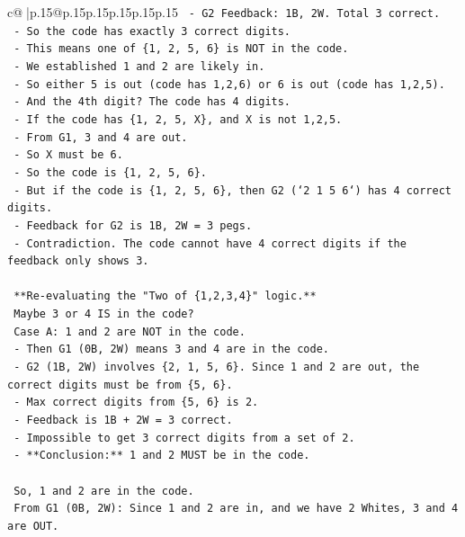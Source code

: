 \documentclass{article}
\begin{document}
{\begin{supertabular}{c@{$\;$}|p{.15\linewidth}@{}p{.15\linewidth}p{.15\linewidth}p{.15\linewidth}p{.15\linewidth}p{.15\linewidth}}
{{{\texttt{    {-} G2 Feedback: 1B, 2W. Total 3 correct.} \\
\texttt{    {-} So the code has exactly 3 correct digits.} \\
\texttt{    {-} This means one of \{1, 2, 5, 6\} is NOT in the code.} \\
\texttt{    {-} We established 1 and 2 are likely in.} \\
\texttt{    {-} So either 5 is out (code has 1,2,6) or 6 is out (code has 1,2,5).} \\
\texttt{    {-} And the 4th digit? The code has 4 digits.} \\
\texttt{    {-} If the code has \{1, 2, 5, X\}, and X is not 1,2,5.} \\
\texttt{    {-} From G1, 3 and 4 are out.} \\
\texttt{    {-} So X must be 6.} \\
\texttt{    {-} So the code is \{1, 2, 5, 6\}.} \\
\texttt{    {-} But if the code is \{1, 2, 5, 6\}, then G2 (`2 1 5 6`) has 4 correct digits.} \\
\texttt{    {-} Feedback for G2 is 1B, 2W = 3 pegs.} \\
\texttt{    {-} Contradiction. The code cannot have 4 correct digits if the feedback only shows 3.} \\
\\ 
\texttt{    **Re{-}evaluating the "Two of \{1,2,3,4\}" logic.**} \\
\texttt{    Maybe 3 or 4 IS in the code?} \\
\texttt{    Case A: 1 and 2 are NOT in the code.} \\
\texttt{    {-} Then G1 (0B, 2W) means 3 and 4 are in the code.} \\
\texttt{    {-} G2 (1B, 2W) involves \{2, 1, 5, 6\}. Since 1 and 2 are out, the correct digits must be from \{5, 6\}.} \\
\texttt{    {-} Max correct digits from \{5, 6\} is 2.} \\
\texttt{    {-} Feedback is 1B + 2W = 3 correct.} \\
\texttt{    {-} Impossible to get 3 correct digits from a set of 2.} \\
\texttt{    {-} **Conclusion:** 1 and 2 MUST be in the code.} \\
\\ 
\texttt{    So, 1 and 2 are in the code.} \\
\texttt{    From G1 (0B, 2W): Since 1 and 2 are in, and we have 2 Whites, 3 and 4 are OUT.} \\
}}}
\end{supertabular}}
\end{document}
